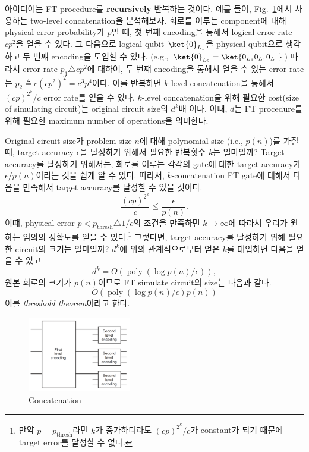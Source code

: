 아이디어는 FT procedure를 \textbf{recursively} 반복하는 것이다. 예를 들어, Fig.~\ref{fig:concat}에서 사용하는 two-level concatenation을 분석해보자.
회로를 이루는 component에 대해 physical error probability가 $p$일 때, 첫 번째 encoding을 통해서 logical error rate $cp^2$을 얻을 수 있다. 그 다음으로 logical qubit $\ket{0}_{L_1}$을 physical qubit으로 생각하고 두 번쨰 encoding을 도입할 수 있다. (e.g., $\ket{0}_{L_2} = \ket{0_{L_1}0_{L_1}0_{L_1}}$)
따라서 error rate $p_1 \triangle cp^2$에 대하여, 두 번쨰 encoding을 통해서 얻을 수 있는 error rate는 $p_2 \triangleq c (cp^2)^2 = c^3p^4$이다. 
이를 반복하면 $k$-level concatenation을 통해서 $(cp)^{2^k}/ c$ error rate를 얻을 수 있다. $k$-level concatenation을 위해 필요한 cost(size of simulating circuit)는 original circuit size의 $d^k$배 이다. 이때, $d$는 FT procedure를 위해 필요한 maximum number of operations을 의미한다. 

Original circuit size가 problem size $n$에 대해 polynomial size (i.e., $p(n)$)를 가질 때, target accuracy $\epsilon$을 달성하기 위해서 필요한 반복횟수 $k$는 얼마일까? Target accuracy를 달성하기 위해서는, 회로를 이루는 각각의 gate에 대한 target accuracy가 $\epsilon/p(n)$이라는 것을 쉽게 알 수 있다. 따라서, $k$-concatenation FT gate에 대해서 다음을 만족해서 target accuracy를 달성할 수 있을 것이다.
\begin{equation*}
    \frac{(c p)^{2^k}}{c} \leq \frac{\epsilon}{p(n)} .
\end{equation*}
이떄, physical error $p < p_{\text{thresh}} \triangle 1/c$의 조건을 만족하면 $k\rightarrow \infty$에 따라서 우리가 원하는 임의의 정확도를 얻을 수 있다.\footnote{만약 $p = p_{\text{thresh}}$라면 $k$가 증가하더라도 $(cp)^{2^k}/c$가 constant가 되기 때문에 target error를 달성할 수 없다.}
그렇다면, target accuracy를 달성하기 위해 필요한 circuit의 크기는 얼마일까? $d^k$에 위의 관계식으로부터 얻은 $k$를 대입하면 다음을 얻을 수 있고
\begin{equation*}
    d^k=O(\operatorname{poly}(\log p(n) / \epsilon)),
\end{equation*}
원본 회로의 크기가 $p(n)$이므로 FT simulate circuit의 size는 다음과 같다.
\begin{equation*}
    O(\operatorname{poly}(\log p(n) / \epsilon) p(n))
\end{equation*}
이를 \textit{threshold theorem}이라고 한다. 

\begin{figure}[h]
    \centering
    \includegraphics[width=0.4\textwidth]{figures/C7_FT_concatenation.png}
    \caption{Concatenation}
    \label{fig:concat}
\end{figure}

